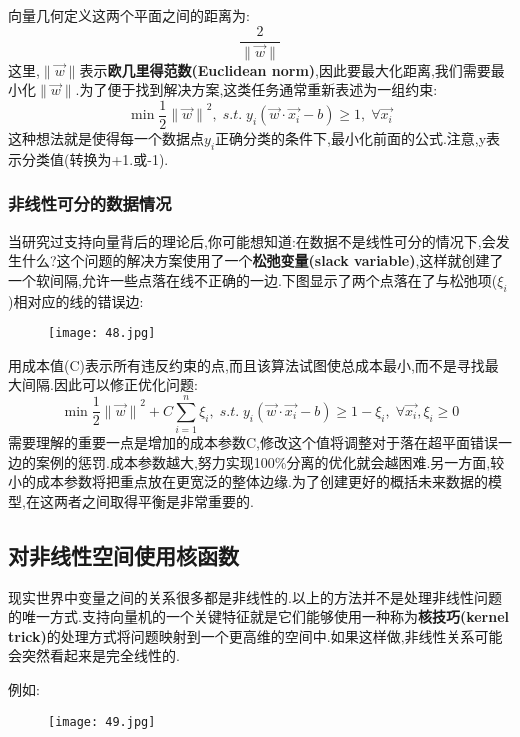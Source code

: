 \documentclass[11pt,a4paper,oneside]{book}
\begin{document}
向量几何定义这两个平面之间的距离为:
\begin{equation}
\frac{2}{\parallel\vec{w}\parallel}
\end{equation}
这里,$\parallel\vec{w}\parallel$表示\textbf{欧几里得范数(Euclidean norm)},因此要最大化距离,我们需要最小化$\parallel\vec{w}\parallel$.为了便于找到解决方案,这类任务通常重新表述为一组约束:
\begin{equation}
	\min\frac{1}{2}{\parallel\vec{w}\parallel}^2,\;
	s.t.\;y_i(\vec{w}\cdot\vec{x_i}-b)\geq 1,\;\forall \vec{x_i}
\end{equation}
这种想法就是使得每一个数据点$y_i$正确分类的条件下,最小化前面的公式.注意,y表示分类值(转换为+1.或-1).
\subsubsection{非线性可分的数据情况}

当研究过支持向量背后的理论后,你可能想知道:在数据不是线性可分的情况下,会发生什么?这个问题的解决方案使用了一个\textbf{松弛变量(slack variable)},这样就创建了一个软间隔,允许一些点落在线不正确的一边.下图显示了两个点落在了与松弛项($\xi_i$)相对应的线的错误边:
\begin{figure}[H]
	\centering
	\texttt{[image: 48.jpg]}
\end{figure}
用成本值(C)表示所有违反约束的点,而且该算法试图使总成本最小,而不是寻找最大间隔.因此可以修正优化问题:
\begin{equation}
	\min\frac{1}{2}{\parallel\vec{w}\parallel}^2+C\sum^{n}_{i=1}\xi_i,\;
	s.t.\;y_i(\vec{w}\cdot\vec{x_i}-b)\geq 1-\xi_i,\;\forall \vec{x_i},\xi_i\geq 0
\end{equation}
需要理解的重要一点是增加的成本参数C,修改这个值将调整对于落在超平面错误一边的案例的惩罚.成本参数越大,努力实现100\%分离的优化就会越困难.另一方面,较小的成本参数将把重点放在更宽泛的整体边缘.为了创建更好的概括未来数据的模型,在这两者之间取得平衡是非常重要的.

\subsection{对非线性空间使用核函数}
现实世界中变量之间的关系很多都是非线性的.以上的方法并不是处理非线性问题的唯一方式.支持向量机的一个关键特征就是它们能够使用一种称为\textbf{核技巧(kernel trick)}的处理方式将问题映射到一个更高维的空间中.如果这样做,非线性关系可能会突然看起来是完全线性的.

例如:
\begin{figure}[H]
	\centering
	\texttt{[image: 49.jpg]}
\end{figure}
\end{document}
